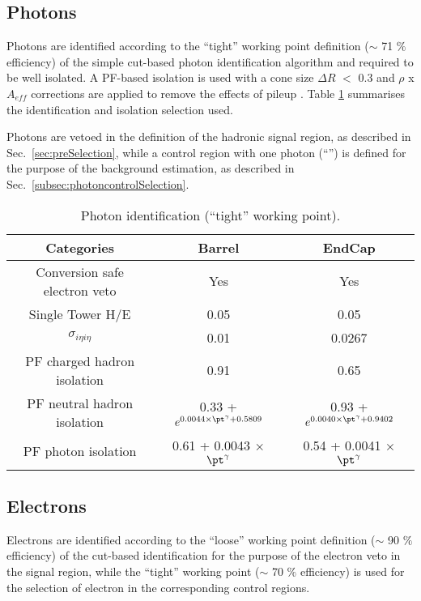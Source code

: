 \subsection{Photons}
\label{sec:photon-id}
Photons are identified according to the ``tight'' working point definition ($\sim$ 71 $\%$ efficiency) 
of the simple cut-based photon identification algorithm \cite{photon-id} 
and required to be well isolated. 
A PF-based isolation is used with a cone size $\Delta R$ $<$ 0.3 and $\rho$ x $A_{eff}$ corrections are applied to remove the effects of pileup \cite{pf-photon}. 
Table \ref{tab:photon-id-gamma} summarises the identification and isolation selection used. 

Photons are vetoed in the definition of the hadronic signal region, 
as described in Sec.~\ref{sec:preSelection}, while a 
control region with one photon (``\gj'') is defined for the purpose of the background estimation, 
as described in Sec.~\ref{subsec:photoncontrolSelection}.


\begin{table}[ht!]
  \caption{Photon identification (``tight'' working point).\label{tab:photon-id-gamma}}
  \centering
  \footnotesize
  \begin{tabular}{ ccc }
    \hline
    \hline
    Categories                    & Barrel                             & EndCap                             \\
    \hline
    Conversion safe electron veto & Yes                                & Yes                                \\
    Single Tower H/E              & 0.05                               & 0.05                               \\
    $\sigma_{i\eta i\eta}$        & 0.01                               & 0.0267                               \\
    PF charged hadron isolation   & 0.91                               & 0.65                               \\
    PF neutral hadron isolation   & 0.33 + $ e^{0.0044 \times \pt^{\gamma} + 0.5809}$  &  0.93 + $ e^{0.0040 \times \pt^{\gamma} + 0.9402}$ \\
    PF photon isolation           & 0.61 + 0.0043 $\times$ $\pt^{\gamma}$ & 0.54 + 0.0041 $\times$ $\pt^{\gamma}$ \\
    \hline
    \hline
  \end{tabular}
  \end{table}


\subsection{Electrons}
\label{sec:electron-id}
Electrons are identified according to the ``loose'' working point definition ($\sim$ 90 $\%$ efficiency) 
of the cut-based identification \cite{electron-id} for the purpose of the electron veto in the signal region, while the ``tight'' working point ($\sim$ 70 $\%$ efficiency) is used for the selection of electron in the corresponding control regions. 

